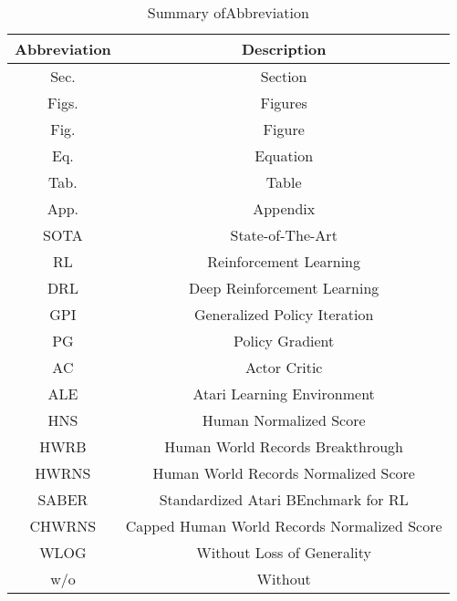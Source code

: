 \documentclass[nohyperref]{article}
\theoremstyle{plain}
\begin{document}
\begin{table}[!hb]
	\centering
	\caption{Summary ofAbbreviation}
	\label{tab: abbreviation}
	\begin{tabular}{|c| c|}
		\hline
		\textbf{Abbreviation} &\textbf{Description}\\
		\hline
		Sec.  & Section \citep{agent57} \\
		\hline
		Figs. & Figures \citep{dreamerv2} \\
		\hline
		Fig. & Figure \citep{agent57} \\
		\hline
		Eq.     & Equation \citep{agent57}\\
		\hline
		Tab.    & Table \citep{agent57} \\
		\hline
		App.    & Appendix \citep{agent57} \\
		\hline
		SOTA & State-of-The-Art \citep{agent57}    \\
		\hline
		RL  & Reinforcement Learning \citep{sutton} \\
		\hline
		DRL & Deep Reinforcement Learning \citep{sutton} \\
        \hline
        GPI & Generalized Policy Iteration \citep{sutton} \\
        \hline
        PG  & Policy Gradient \citep{sutton} \\
        \hline
        AC  & Actor Critic \citep{sutton} \\
        \hline
        ALE & Atari Learning Environment \citep{ale} \\
        \hline
        HNS   & Human Normalized Score \citep{ale} \\
        \hline
        HWRB & Human World Records Breakthrough \\
        \hline
        HWRNS & Human World Records Normalized Score \\
        \hline
        SABER & Standardized Atari BEnchmark for RL \citep{atarihuman}\\
        \hline
        CHWRNS & Capped Human World Records Normalized Score \\      
        \hline
        WLOG   & Without Loss of Generality \\
        \hline
        w/o    & Without \\
		\hline
	\end{tabular} 
\end{table}
\end{document}
